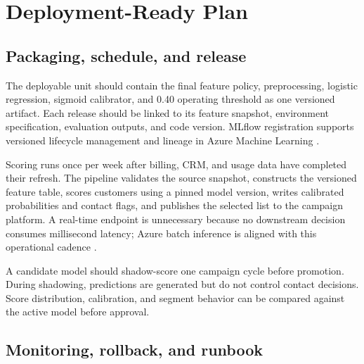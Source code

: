 \documentclass[11pt]{article}
\begin{document}
\section{Deployment-Ready Plan}

\subsection{Packaging, schedule, and release}

The deployable unit should contain the final feature policy, preprocessing, logistic regression, sigmoid calibrator, and 0.40 operating threshold as one versioned artifact. Each release should be linked to its feature snapshot, environment specification, evaluation outputs, and code version. MLflow registration supports versioned lifecycle management and lineage in Azure Machine Learning \citep{mlflowazure}.

Scoring runs once per week after billing, CRM, and usage data have completed their refresh. The pipeline validates the source snapshot, constructs the versioned feature table, scores customers using a pinned model version, writes calibrated probabilities and contact flags, and publishes the selected list to the campaign platform. A real-time endpoint is unnecessary because no downstream decision consumes millisecond latency; Azure batch inference is aligned with this operational cadence \citep{azurebatch}.

A candidate model should shadow-score one campaign cycle before promotion. During shadowing, predictions are generated but do not control contact decisions. Score distribution, calibration, and segment behavior can be compared against the active model before approval.

\subsection{Monitoring, rollback, and runbook}
\end{document}

